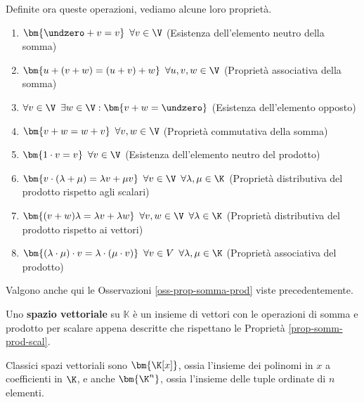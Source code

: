 \documentclass[11pt, a4paper, titlepage, oneside]{scrbook}
\begin{document}
\bigskip

Definite ora queste operazioni, vediamo alcune loro proprietà. \nopagebreak

\begin{Proprieta}
\label{prop-somm-prod-scal}
\begin{enumerate}
    \item $\bm{\undzero + v = v} \enspace \forall v \in \V$ \enspace (Esistenza dell'elemento neutro della somma)
    \item $\bm{u + (v + w) = (u + v) + w} \enspace \forall u,v,w \in \V$ \enspace (Proprietà associativa della somma)
    \item $\forall v \in \V \enspace \exists w \in \V : \bm{v + w = \undzero}$ \enspace (Esistenza dell'elemento opposto)
    \item $\bm{v + w = w + v} \enspace \forall v,w \in \V$ \enspace (Proprietà commutativa della somma)
    \item $\bm{1 \cdot v = v} \enspace \forall v \in \V$ \enspace (Esistenza dell'elemento neutro del prodotto)
    \item $\bm{v \cdot (\lambda + \mu) = \lambda v + \mu v} \enspace \forall v \in \V \enspace \forall \lambda,\mu \in \K$ \enspace (Proprietà distributiva del prodotto rispetto agli scalari)
    \item $\bm{(v + w) \lambda = \lambda v + \lambda w} \enspace \forall v,w \in \V \enspace \forall \lambda \in \K$ \enspace (Proprietà distributiva del prodotto rispetto ai vettori)
    \item $\bm{(\lambda \cdot \mu) \cdot v = \lambda \cdot (\mu \cdot v)} \enspace \forall v \in V \enspace \forall \lambda,\mu \in \K$ \enspace (Proprietà associativa del prodotto)
\end{enumerate}
\end{Proprieta}

Valgono anche qui le Osservazioni \ref{oss-prop-somma-prod} viste precedentemente.

\begin{Definizione}
\label{def-spa-vet}
Uno \textbf{spazio vettoriale} su $\mathbb{K}$ è un insieme di vettori con le operazioni di somma e prodotto per scalare appena descritte che rispettano le Proprietà \ref{prop-somm-prod-scal}.
\end{Definizione}

Classici spazi vettoriali sono $\bm{\K[x]}$, ossia l'insieme dei polinomi in $x$ a coefficienti in $\K$, e anche $\bm{\K^n}$, ossia l'insieme delle tuple ordinate di $n$ elementi.
\end{document}
